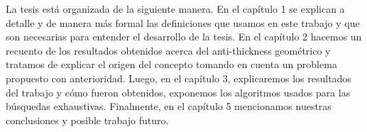 La tesis está organizada de la siguiente manera. En el capítulo 1 se explican
a detalle y de manera más formal las definiciones que usamos en este trabajo y que
son necesarias para entender el desarrollo de la tesis. En el capítulo 2 hacemos un recuento de los
resultados obtenidos acerca del anti-thickness geométrico y tratamos de explicar el origen del concepto
tomando en cuenta un problema propuesto con anterioridad. Luego, en el capítulo 3, explicaremos los
resultados del trabajo y cómo fueron obtenidos, exponemos los algoritmos usados para las
búsquedas exhaustivas. Finalmente, en el capítulo 5 mencionamos nuestras conclusiones y posible trabajo
futuro.
